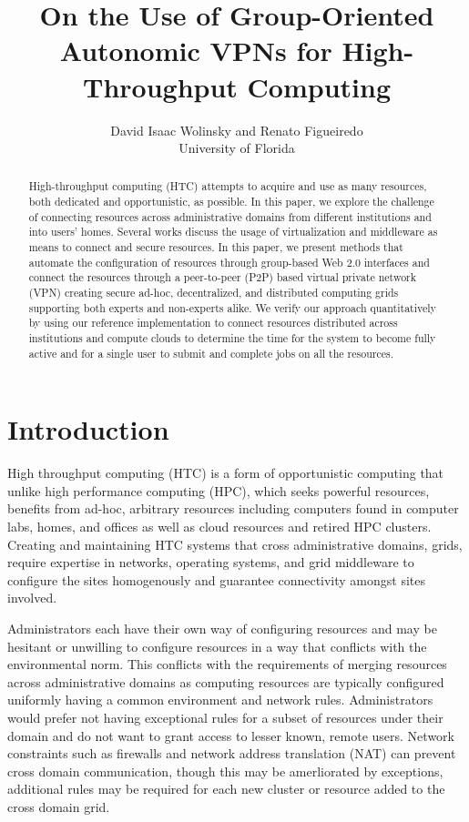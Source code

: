 \documentclass{sig-alternate}
\begin{document}
\title{On the Use of Group-Oriented Autonomic VPNs for High-Throughput Computing}

\author{
David Isaac Wolinsky and Renato Figueiredo
\\
University of Florida
\\
}

\maketitle

\begin{abstract}
High-throughput computing (HTC) attempts to acquire and use as many resources,
both dedicated and opportunistic, as possible.  In this paper, we explore the
challenge of connecting resources across administrative domains from different
institutions and into users' homes.  Several works discuss the usage of
virtualization and middleware as means to connect and secure resources.  In
this paper, we present methods that automate the configuration of resources
through group-based Web 2.0 interfaces and connect the resources through a
peer-to-peer (P2P) based virtual private network (VPN) creating secure ad-hoc,
decentralized, and distributed computing grids supporting both experts and
non-experts alike.  We verify our approach quantitatively by using our
reference implementation to connect resources distributed across institutions
and compute clouds to determine the time for the system to become fully active
and for a single user to submit and complete jobs on all the resources.
\end{abstract}

\section{Introduction}
High throughput computing (HTC) is a form of opportunistic computing that unlike
high performance computing (HPC), which seeks powerful resources, benefits from
ad-hoc, arbitrary resources including computers found in computer labs, homes,
and offices as well as cloud resources and retired HPC clusters.  Creating and
maintaining HTC systems that cross administrative domains, grids, require
expertise in networks, operating systems, and grid middleware to configure
the sites homogenously and guarantee connectivity amongst sites involved.

Administrators each have their own way of configuring resources and may be
hesitant or unwilling to configure resources in a way that conflicts with the
environmental norm.  This conflicts with the requirements of merging resources
across administrative domains as computing resources are typically configured
uniformly having a common environment and network rules.  Administrators would
prefer not having exceptional rules for a subset of resources under their
domain and do not want to grant access to lesser known, remote users.  Network
constraints such as firewalls and network address translation (NAT) can prevent
cross domain communication, though this may be amerliorated by exceptions,
additional rules may be required for each new cluster or resource added to the
cross domain grid.
\end{document}
